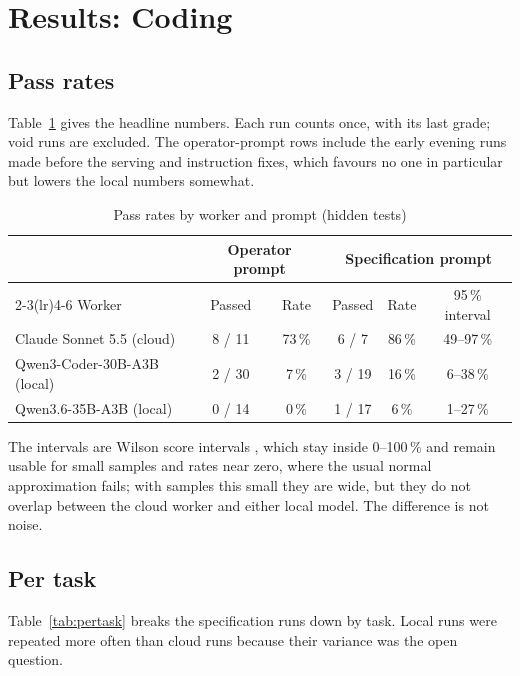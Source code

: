\section{Results: Coding}\label{sec:results-coding}

\subsection{Pass rates}

Table~\ref{tab:passrates} gives the headline numbers. Each run counts once, with its last grade; void runs are
excluded. The operator-prompt rows include the early evening runs made before the serving and instruction fixes,
which favours no one in particular but lowers the local numbers somewhat.

\begin{table}[htbp]
\centering
\small
{}
\caption{Pass rates by worker and prompt (hidden tests)}\label{tab:passrates}
\begin{tabular}{lccccc}
\toprule
& \multicolumn{2}{c}{Operator prompt} & \multicolumn{3}{c}{Specification prompt} \\
\cmidrule(lr){2-3}\cmidrule(lr){4-6}
Worker & Passed & Rate & Passed & Rate & 95\,\% interval \\
\midrule
Claude Sonnet 5.5 (cloud) & 8 / 11 & 73\,\% & 6 / 7 & 86\,\% & 49--97\,\% \\
Qwen3-Coder-30B-A3B (local) & 2 / 30 & 7\,\% & 3 / 19 & 16\,\% & 6--38\,\% \\
Qwen3.6-35B-A3B (local) & 0 / 14 & 0\,\% & 1 / 17 & 6\,\% & 1--27\,\% \\
\bottomrule
\end{tabular}
\end{table}

The intervals are Wilson score intervals \citep{Wilson-1927aa}, which stay inside 0--100\,\% and remain usable for
small samples and rates near zero, where the usual normal approximation fails; with samples this small they are wide, but they do not overlap between the
cloud worker and either local model. The difference is not noise.

\subsection{Per task}

Table~\ref{tab:pertask} breaks the specification runs down by task. Local runs were repeated more often than cloud
runs because their variance was the open question.

